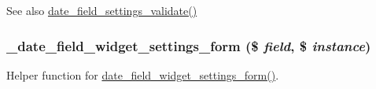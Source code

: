 \begin{DoxySeeAlso}{See also}
\hyperlink{date__admin_8inc_a6a824eba39c878d75f07f6ae4d585b36}{date\_\-field\_\-settings\_\-validate()} 
\end{DoxySeeAlso}
\hypertarget{date__admin_8inc_a794106e9989d98e7ed83b325186a7f1c}{
\subsubsection[{\_\-date\_\-field\_\-widget\_\-settings\_\-form}]{\setlength{\rightskip}{0pt plus 5cm}\_\-date\_\-field\_\-widget\_\-settings\_\-form (\$ {\em field}, \/  \$ {\em instance})}}
\label{date__admin_8inc_a794106e9989d98e7ed83b325186a7f1c}
Helper function for \hyperlink{date_8field_8inc_aacfb6134f4d15984d676313004bc7939}{date\_\-field\_\-widget\_\-settings\_\-form()}.


